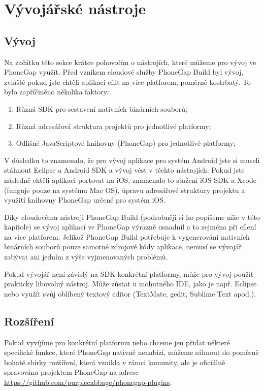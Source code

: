 \section{Vývojářské nástroje}
\subsection{Vývoj}
Na začátku této sekce krátce pohovořím o nástrojích, které můžeme pro vývoj ve PhoneGap využít. Před vznikem cloudové služby PhoneGap Build byl vývoj, zvláště pokud jste chtěli aplikaci cílit na více platforem, poměrně kostrbatý. To bylo zapříčiněno několika faktory:

\begin{enumerate}
	\item Různá SDK pro sestavení nativních binárních souborů;
	\item Různá adresářová struktura projektů pro jednotlivé platformy;
	\item Odlišné JavaScriptové knihovny (PhoneGap) pro jednotlivé platformy;
\end{enumerate}

V důsledku to znamenalo, že pro vývoj aplikace pro systém Android jste si museli stáhnout Eclipse a Android SDK a vývoj vést v těchto nástrojích. Pokud jste následně chtěli aplikaci portovat na iOS, znamenalo to stažení iOS SDK a Xcode (funguje pouze na systému Mac OS), úpravu adresářové struktury projektu a využití knihovny PhoneGap určené pro systém iOS.

Díky cloudovému nástroji PhoneGap Build (podrobněji si ho popíšeme níže v této kapitole) se vývoj aplikací ve PhoneGap výrazně usnadnil a to zejména při cílení na více platforem. Jelikož PhoneGap Build potřebuje k vygenerování nativních binárních souborů pouze samotné zdrojové kódy aplikace, nemusí se vývojář zabývat ani jedním z výše vyjmenovaných problémů.

Pokud vývojář není závislý na SDK konkrétní platformy, může pro vývoj použít prakticky libovolný nástroj. Může zůstat u mohutného IDE, jako je např. Eclipse nebo využít svůj oblíbený textový editor (TextMate, gedit, Sublime Text apod.).

\subsection{Rozšíření}
Pokud vyvíjíme pro konkrétní platformu nebo chceme jen přidat některé specifické funkce, které PhoneGap nativně nenabízí, můžeme sáhnout do poměrně bohaté sbírky rozšíření, která vznikla v rámci komunity, ale je oficiálně spravována projektem PhoneGap na adrese \url{https://github.com/purplecabbage/phonegap-plugins}. %

